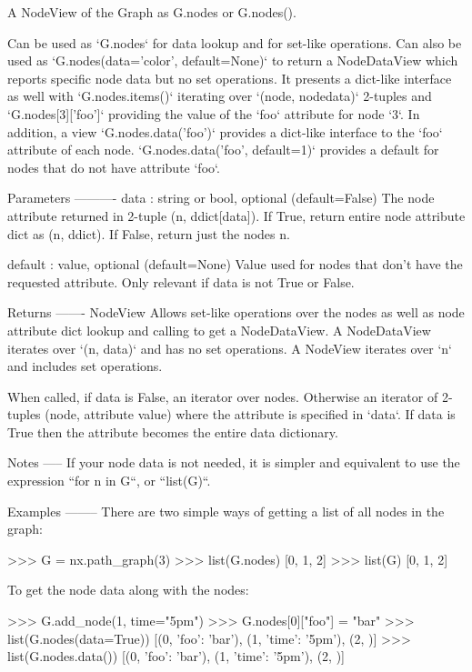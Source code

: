 \begin{DoxyVerb}A NodeView of the Graph as G.nodes or G.nodes().

Can be used as `G.nodes` for data lookup and for set-like operations.
Can also be used as `G.nodes(data='color', default=None)` to return a
NodeDataView which reports specific node data but no set operations.
It presents a dict-like interface as well with `G.nodes.items()`
iterating over `(node, nodedata)` 2-tuples and `G.nodes[3]['foo']`
providing the value of the `foo` attribute for node `3`. In addition,
a view `G.nodes.data('foo')` provides a dict-like interface to the
`foo` attribute of each node. `G.nodes.data('foo', default=1)`
provides a default for nodes that do not have attribute `foo`.

Parameters
----------
data : string or bool, optional (default=False)
    The node attribute returned in 2-tuple (n, ddict[data]).
    If True, return entire node attribute dict as (n, ddict).
    If False, return just the nodes n.

default : value, optional (default=None)
    Value used for nodes that don't have the requested attribute.
    Only relevant if data is not True or False.

Returns
-------
NodeView
    Allows set-like operations over the nodes as well as node
    attribute dict lookup and calling to get a NodeDataView.
    A NodeDataView iterates over `(n, data)` and has no set operations.
    A NodeView iterates over `n` and includes set operations.

    When called, if data is False, an iterator over nodes.
    Otherwise an iterator of 2-tuples (node, attribute value)
    where the attribute is specified in `data`.
    If data is True then the attribute becomes the
    entire data dictionary.

Notes
-----
If your node data is not needed, it is simpler and equivalent
to use the expression ``for n in G``, or ``list(G)``.

Examples
--------
There are two simple ways of getting a list of all nodes in the graph:

>>> G = nx.path_graph(3)
>>> list(G.nodes)
[0, 1, 2]
>>> list(G)
[0, 1, 2]

To get the node data along with the nodes:

>>> G.add_node(1, time="5pm")
>>> G.nodes[0]["foo"] = "bar"
>>> list(G.nodes(data=True))
[(0, {'foo': 'bar'}), (1, {'time': '5pm'}), (2, {})]
>>> list(G.nodes.data())
[(0, {'foo': 'bar'}), (1, {'time': '5pm'}), (2, {})]


\end{DoxyVerb}
